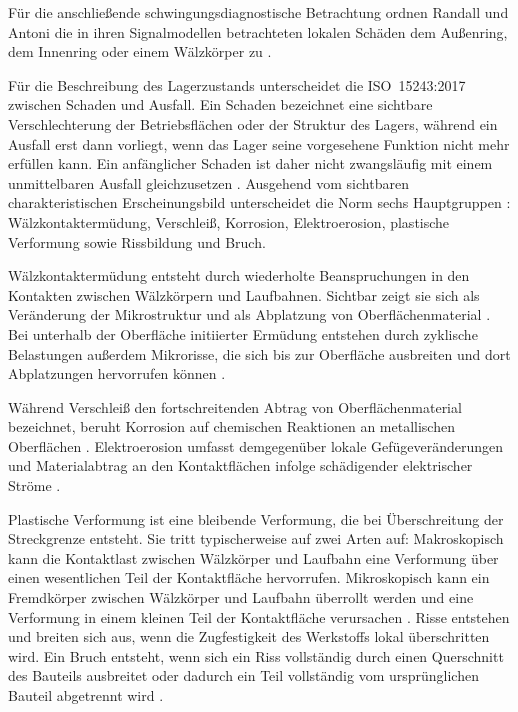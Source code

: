 Für die anschließende schwingungsdiagnostische Betrachtung ordnen Randall und
Antoni die in ihren Signalmodellen betrachteten lokalen Schäden dem Außenring,
dem Innenring oder einem Wälzkörper zu
\cite[S.~486--487, Abschn.~1 und Abb.~1]{randallRollingElementBearing2011a}.

Für die Beschreibung des Lagerzustands unterscheidet die ISO~15243:2017
zwischen Schaden und Ausfall. Ein Schaden bezeichnet eine sichtbare
Verschlechterung der Betriebsflächen oder der Struktur des Lagers, während ein
Ausfall erst dann vorliegt, wenn das Lager seine vorgesehene Funktion nicht mehr
erfüllen kann. Ein anfänglicher Schaden ist daher nicht zwangsläufig mit einem
unmittelbaren Ausfall gleichzusetzen
\cite[S.~2, Abschn.~3.2--3.4 und Anm.~1 zu Abschn.~3.3]{zotero-item-30}.
Ausgehend vom sichtbaren charakteristischen Erscheinungsbild unterscheidet die
Norm sechs Hauptgruppen
\cite[S.~2--3, Abschn.~4 und Abb.~2]{zotero-item-30}: Wälzkontaktermüdung,
Verschleiß, Korrosion, Elektroerosion, plastische Verformung sowie Rissbildung
und Bruch.

Wälzkontaktermüdung entsteht durch wiederholte Beanspruchungen in den Kontakten
zwischen Wälzkörpern und Laufbahnen. Sichtbar zeigt sie sich als Veränderung
der Mikrostruktur und als Abplatzung von Oberflächenmaterial
\cite[S.~3--4, Abschn.~5.1.1]{zotero-item-30}. Bei unterhalb der Oberfläche
initiierter Ermüdung entstehen durch zyklische Belastungen außerdem Mikrorisse,
die sich bis zur Oberfläche ausbreiten und dort Abplatzungen hervorrufen können
\cite[S.~4, Abschn.~5.1.2]{zotero-item-30}.

Während Verschleiß den fortschreitenden Abtrag von Oberflächenmaterial
bezeichnet, beruht Korrosion auf
chemischen Reaktionen an metallischen Oberflächen
\cite[S.~6, Abschn.~5.2.1; S.~9, Abschn.~5.3.1]{zotero-item-30}.
Elektroerosion umfasst demgegenüber lokale Gefügeveränderungen und
Materialabtrag an den Kontaktflächen infolge schädigender elektrischer Ströme
\cite[S.~12, Abschn.~5.4.1]{zotero-item-30}.

Plastische Verformung ist eine bleibende Verformung, die bei Überschreitung der
Streckgrenze entsteht. Sie tritt typischerweise auf zwei Arten auf:
Makroskopisch kann die Kontaktlast zwischen Wälzkörper und Laufbahn eine
Verformung über einen wesentlichen Teil der Kontaktfläche hervorrufen.
Mikroskopisch kann ein Fremdkörper zwischen Wälzkörper und Laufbahn überrollt
werden und eine Verformung in einem kleinen Teil der Kontaktfläche verursachen
\cite[S.~14, Abschn.~5.5.1]{zotero-item-30}.
Risse entstehen und breiten sich aus, wenn die Zugfestigkeit des Werkstoffs
lokal überschritten wird. Ein Bruch entsteht, wenn sich ein Riss vollständig
durch einen Querschnitt des Bauteils ausbreitet oder dadurch ein Teil vollständig
vom ursprünglichen Bauteil abgetrennt wird
\cite[S.~17, Abschn.~5.6.1]{zotero-item-30}.

